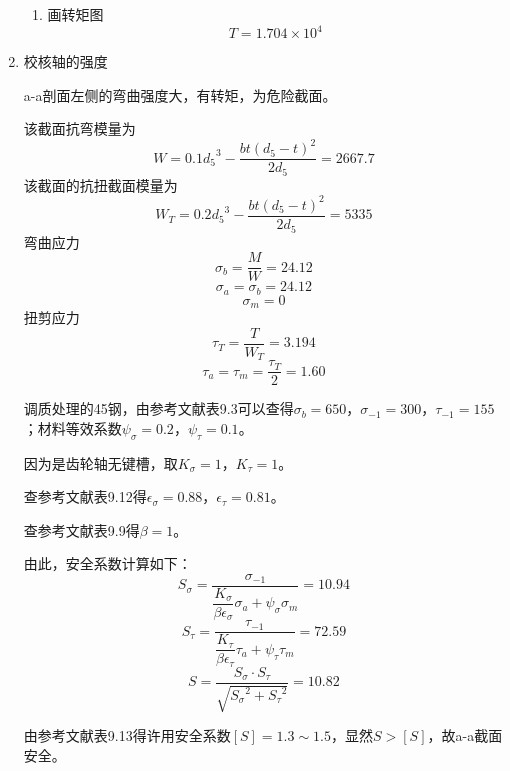 \begin{enumerate}[A]
\begin{enumerate}[a]
		\item 画转矩图$$T=1.704\times 10^4$$
	\end{enumerate}
	\item 校核轴的强度
	\par a-a剖面左侧的弯曲强度大，有转矩，为危险截面。
	\par 该截面抗弯模量为
	$$W=0.1{d_5}^3-\dfrac{bt\left(d_5-t\right)^2}{2d_5}=2667.7$$
	该截面的抗扭截面模量为
	$$W_T=0.2{d_5}^3-\dfrac{bt\left(d_5-t\right)^2}{2d_5}=5335$$
	弯曲应力$$\sigma_b=\dfrac{M}{W}=24.12$$
	$$\sigma_a=\sigma_b=24.12$$
	$$\sigma_m=0$$
	扭剪应力
	$$\tau_T=\dfrac{T}{W_T}=3.194$$
	$$\tau_a=\tau_m=\dfrac{\tau_T}{2}=1.60$$
	\par 调质处理的45钢，由参考文献\cite{2}表9.3可以查得$\sigma_b=650$，$\sigma_{-1}=300$，$\tau_{-1}=155$；材料等效系数$\psi_\sigma=0.2$，$\psi_\tau=0.1$。
	\par 因为是齿轮轴无键槽，取$K_\sigma=1$，$K_\tau=1$。
	\par 查参考文献\cite{2}表9.12得$\epsilon_\sigma=0.88$，$\epsilon_\tau=0.81$。
	\par 查参考文献\cite{2}表9.9得$\beta=1$。
	\par 由此，安全系数计算如下：
	$$S_\sigma=\dfrac{\sigma_{-1}}{\dfrac{K_\sigma}{\beta \epsilon_\sigma}\sigma_a+\psi_\sigma \sigma_m}=10.94$$
	$$S_\tau=\dfrac{\tau_{-1}}{\dfrac{K_\tau}{\beta \epsilon_\tau}\tau_a+\psi_\tau \tau_m}=72.59$$
	$$S=\dfrac{S_\sigma\cdot S_\tau}{\sqrt{{S_\sigma}^2+{S_\tau}^2}}=10.82$$
	\par 由参考文献\cite{2}表9.13得许用安全系数$\left[S\right]=1.3\sim 1.5$，显然$S>\left[S\right]$，故a-a截面安全。
	

\end{enumerate}
